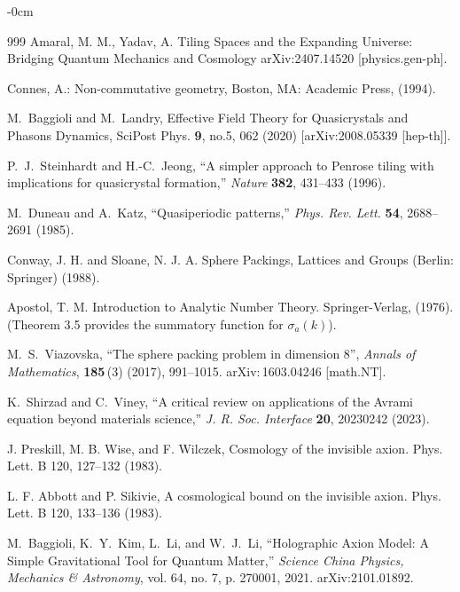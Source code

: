 \documentclass[universe,article,submit,pdftex,moreauthors]{Definitions/mdpi}
\begin{document}
\begin{adjustwidth}{-\extralength}{0cm}
{\begin{thebibliography}{999}
    Amaral, M. M., Yadav, A. Tiling Spaces and the Expanding Universe: Bridging Quantum Mechanics and Cosmology arXiv:2407.14520 [physics.gen-ph].

  Connes, A.: Non-commutative geometry, Boston, MA: Academic Press, (1994).

    M.~Baggioli and M.~Landry,
    Effective Field Theory for Quasicrystals and Phasons Dynamics,
    SciPost Phys. \textbf{9}, no.5, 062 (2020)
    [arXiv:2008.05339 [hep-th]].

    P.~J.~Steinhardt and H.-C.~Jeong, ``A simpler approach to Penrose tiling with implications for quasicrystal formation,'' \textit{Nature} \textbf{382}, 431–433 (1996).

    M.~Duneau and A.~Katz, ``Quasiperiodic patterns,'' \textit{Phys. Rev. Lett.} \textbf{54}, 2688–2691 (1985).

     Conway, J. H. and Sloane, N. J. A. Sphere Packings, Lattices and Groups (Berlin: Springer) (1988).

    Apostol, T. M. Introduction to Analytic Number Theory. Springer-Verlag, (1976). (Theorem 3.5 provides the summatory function for $\sigma_a(k)$).

    M.~S.~Viazovska, ``The sphere packing problem in dimension 8'', \emph{Annals of Mathematics}, \textbf{185}\,(3) (2017), 991–1015. arXiv:\,1603.04246 [math.NT].

    K.~Shirzad and C.~Viney, ``A critical review on applications of the Avrami equation beyond materials science,'' \textit{J. R. Soc. Interface} \textbf{20}, 20230242 (2023).
    
    J. Preskill, M. B. Wise, and F. Wilczek, Cosmology of the invisible axion. Phys. Lett. B 120, 127–132 (1983).
    
    L. F. Abbott and P. Sikivie, A cosmological bound on the invisible axion. Phys. Lett. B 120, 133–136 (1983).

    M.~Baggioli, K.~Y.~Kim, L.~Li, and W.~J.~Li, ``Holographic Axion Model: A Simple Gravitational Tool for Quantum Matter,'' \emph{Science China Physics, Mechanics \& Astronomy}, vol. 64, no. 7, p. 270001, 2021. {arXiv:2101.01892}.


\end{thebibliography}
}{}

\PublishersNote{}
\end{adjustwidth}
\end{document}
